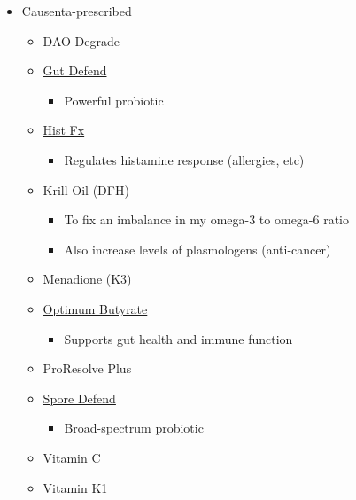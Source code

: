 \documentclass[
  letterpaper,
  DIV=11,
  numbers=noendperiod]{scrreprt}
\providecommand{\tightlist}{%
  \setlength{\itemsep}{0pt}\setlength{\parskip}{0pt}}\usepackage{longtable,booktabs,array}
\begin{document}
\begin{itemize}
\item
  Causenta-prescribed

  \begin{itemize}
  \item
    DAO Degrade
  \item
    \href{https://causenta.com/store/Gut-Defend-Probiotic-p109023222}{Gut
    Defend}

    \begin{itemize}
    \tightlist
    \item
      Powerful probiotic
    \end{itemize}
  \item
    \href{https://causenta.com/store/HistFx-Vitamin-C-Quercetin-and-Stinging-Nettles-Leaf-p109023244}{Hist
    Fx}

    \begin{itemize}
    \tightlist
    \item
      Regulates histamine response (allergies, etc)
    \end{itemize}
  \item
    Krill Oil (DFH)

    \begin{itemize}
    \item
      To fix an imbalance in my omega-3 to omega-6 ratio
    \item
      Also increase levels of plasmologens (anti-cancer)
    \end{itemize}
  \item
    Menadione (K3)
  \item
    \href{https://aimstore.net/products/optimumbutyrate}{Optimum
    Butyrate}

    \begin{itemize}
    \tightlist
    \item
      Supports gut health and immune function
    \end{itemize}
  \item
    ProResolve Plus
  \item
    \href{https://causenta.com/store/Spore-Defend-Probiotic-p319826021}{Spore
    Defend}

    \begin{itemize}
    \tightlist
    \item
      Broad-spectrum probiotic
    \end{itemize}
  \item
    Vitamin C
  \item
    Vitamin K1


\end{itemize}
\end{itemize}
\end{document}
